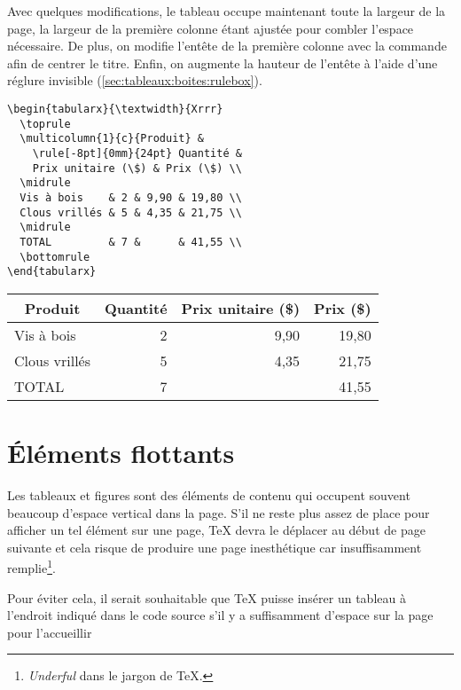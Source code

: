 \begin{exemple}
  Avec quelques modifications, le tableau occupe maintenant toute
  la largeur de la page, la largeur de la première colonne étant
  ajustée pour combler l'espace nécessaire. De plus, on modifie
  l'entête de la première colonne avec la commande \cmd{\multicolumn}
  afin de centrer le titre. Enfin, on augmente la hauteur de l'entête
  à l'aide d'une réglure invisible (\autoref{sec:tableaux:boites:rulebox}).
\begin{lstlisting}
\begin{tabularx}{\textwidth}{Xrrr}
  \toprule
  \multicolumn{1}{c}{Produit} &
    \rule[-8pt]{0mm}{24pt} Quantité &
    Prix unitaire (\$) & Prix (\$) \\
  \midrule
  Vis à bois    & 2 & 9,90 & 19,80 \\
  Clous vrillés & 5 & 4,35 & 21,75 \\
  \midrule
  TOTAL         & 7 &      & 41,55 \\
  \bottomrule
\end{tabularx}
\end{lstlisting}
  \begin{center}
    \begin{tabularx}{\textwidth}{Xrrr}
      \toprule
      \multicolumn{1}{c}{Produit} &
        \rule[-8pt]{0mm}{24pt} Quantité & Prix unitaire (\$) & Prix (\$) \\
      \midrule
      Vis à bois    & 2 & 9,90 & 19,80 \\
      Clous vrillés & 5 & 4,35 & 21,75 \\
      \midrule
      TOTAL         & 7 &      & 41,55 \\
      \bottomrule
    \end{tabularx}
  \end{center}
\end{exemple}


\section{Éléments flottants}
\label{sec:tableaux:floats}

Les tableaux et figures sont des éléments de contenu qui occupent
souvent beaucoup d'espace vertical dans la page. S'il ne reste plus
assez de place pour afficher un tel élément sur une page, {\TeX} devra
le déplacer au début de page suivante et cela risque de produire une
page inesthétique car insuffisamment remplie\footnote{%
  \emph{Underful } dans le jargon de {\TeX}.}. %

Pour éviter cela, il serait souhaitable que {\TeX} puisse insérer un
tableau à l'endroit indiqué dans le code source s'il y a suffisamment
d'espace sur la page pour l'accueillir



